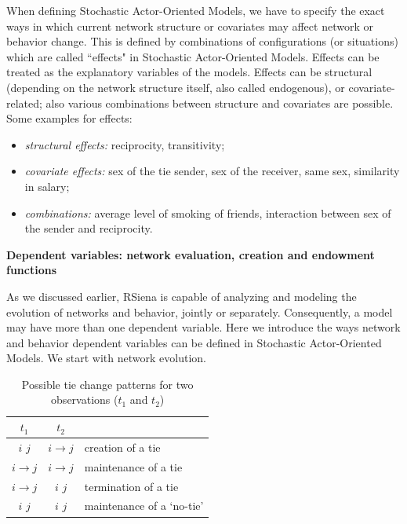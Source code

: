 \documentclass[a4paper,fleqn,11pt]{article}
\newcommand{\+}{\, + \,}
\newcommand{\RS}{{\sf \textsf{RSiena} }}
\newcommand{\saom}{{Stochastic Actor-Oriented Model}}
\begin{document}
When defining {\saom}s, we have to specify
the exact ways in which current network structure or covariates may affect
network or behavior change. This is defined
by combinations of configurations (or situations) which
are called ``effects" in {\saom}s.
Effects can be treated as the explanatory variables of the models.
Effects can be structural (depending on the network structure itself,
also called endogenous), or covariate-related; also various combinations
between structure and covariates are possible. Some examples for effects:
\begin{itemize}
	\item \emph{structural effects:} reciprocity, transitivity;
	\item \emph{covariate effects:} sex of the tie sender, sex of the receiver,
                same sex, similarity in salary;
	\item \emph{combinations:} average level of smoking of friends,
                interaction between sex of the sender and reciprocity.\\
\end{itemize}

\noindent
\textbf{Dependent variables: network evaluation, creation and endowment functions}\\
\label{S_endow}

As we discussed earlier, \RS is capable of analyzing and modeling the
evolution of networks and behavior, jointly or separately.
Consequently, a model may have more than one dependent variable.
Here we introduce the ways network and behavior dependent variables
can be defined in {\saom}s. We start with network evolution.

\def\Fspace{\space\space\space\space}
\begin{table}[h]
	\centering
	\caption{Possible tie change patterns for two observations ($t_1$ and $t_2$)}
	\label{tab:TCpat}
	\vspace{\baselineskip}
	\begin{tabular}{c | c | l}
		$t_{1}$ 				& $t_{2}$ 				&														\\ \hline
		$i$ \Fspace $j$ & $i  \to 		 j$	& creation of a tie 				\\
		$i  \to			 j$	& $i  \to 		 j$	& maintenance of a tie 			\\
		$i  \to			 j$	& $i$ \Fspace $j$ & termination of a tie 			\\
		$i$ \Fspace $j$	& $i$ \Fspace $j$ & maintenance of a `no-tie' \\
	\end{tabular}
\end{table}
\end{document}

